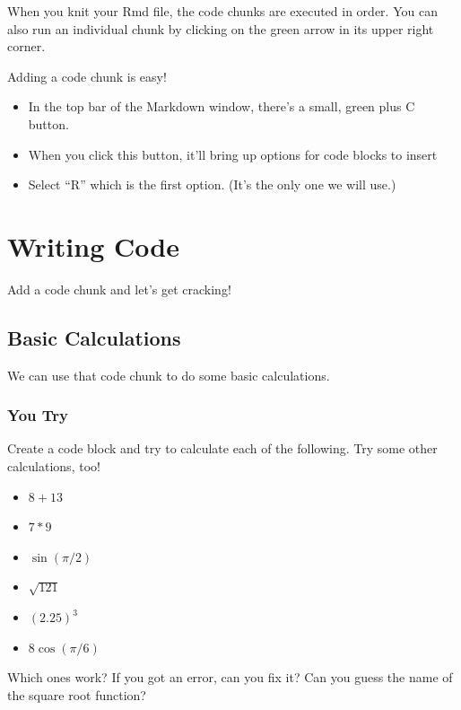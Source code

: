 \documentclass[
]{book}
\providecommand{\tightlist}{%
  \setlength{\itemsep}{0pt}\setlength{\parskip}{0pt}}
\begin{document}
When you knit your Rmd file, the code chunks are executed in order. You can also
run an individual chunk by clicking on the green arrow in its upper right corner.

Adding a code chunk is easy!

\begin{itemize}
\tightlist
\item
  In the top bar of the Markdown window, there's a small, green plus C button.
\item
  When you click this button, it'll bring up options for code blocks to insert
\item
  Select ``R'' which is the first option. (It's the only one we will use.)
\end{itemize}

\hypertarget{writing-code}{%
\section{Writing Code}\label{writing-code}}

Add a code chunk and let's get cracking!

\hypertarget{basic-calculations}{%
\subsection{Basic Calculations}\label{basic-calculations}}

We can use that code chunk to do some basic calculations.

\hypertarget{you-try}{%
\subsubsection{You Try}\label{you-try}}

Create a code block and try to calculate each of the following. Try some other calculations, too!

\begin{itemize}
\tightlist
\item
  \(8+13\)
\item
  \(7*9\)
\item
  \(\sin(\pi/2)\)
\item
  \(\sqrt{121}\)
\item
  \((2.25)^3\)
\item
  \(8 \cos( \pi/6)\)
\end{itemize}

Which ones work? If you got an error, can you fix it? Can you guess the name of the square root function?
\end{document}
